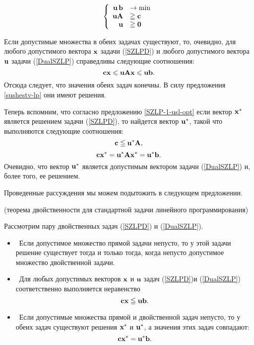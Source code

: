 \begin{equation}\label{DualSZLP}
\left\{
\begin{array}{rl}
 \mathbf{u} \, \mathbf{b} & \to \min  \\
 \mathbf{u} \mathbf{A} & \geqq \mathbf{c} \\
 \mathbf{u} & \geqq \mathbf{0} \\
\end{array} \right.
\end{equation}


    Если допустимые множества в обеих задачах существуют, то, очевидно, для
    любого допустимого вектора $\mathbf{x}$ задачи (\ref{SZLPD}) и
    любого допустимого вектора $\mathbf{u}$ задачи (\ref{DualSZLP})
    справедливы следующие соотношения:
    \[\mathbf{c}\mathbf{x}\leqslant\mathbf{u}\mathbf{A}\mathbf{x}\leqslant\mathbf{u}\mathbf{b}.\]
    Отсюда следует, что значения обеих задач конечны. В силу
    предложения \ref{sushestv-lp} они имеют решения.

    Теперь вспомним, что согласно предложению \ref{SZLP-1-usl-opt}
    если вектор $\mathbf{x^{*}}$ является решением задачи (\ref{SZLPD}),
    то найдется вектор $\mathbf{u^{*}}$, такой что выполняются следующие
    соотношения:
    \[\mathbf{c}\leqq \mathbf{u}^{*}\mathbf{A},\]
    \[\mathbf{c}\mathbf{x}^{*}=\mathbf{u}^{*}\mathbf{A}\mathbf{x}^{*}=\mathbf{u}^{*}\mathbf{b}.\]
    Очевидно, что вектор $\mathbf{u^{*}}$ является допустимым вектором
    задачи (\ref{DualSZLP}) и, более того, ее решением.

    Проведенные рассуждения мы можем подытожить в следующем предложении.

\begin{prop} \label{teor-dv-st} (теорема двойственности для
стандартной задачи линейного программирования)

    Рассмотрим пару двойственных задач (\ref{SZLPD}) и
    (\ref{DualSZLP}).
\begin{itemize}
    \item [$1)$\ ] \
    Если допустимое множество прямой задачи непусто, то у этой
    задачи решение существует тогда и только тогда, когда непусто
    допустимое множество двойственной задачи.
    \item [$2)$\ ] \
    Для любых допустимых векторов $\mathbf{x}$ и $\mathbf{u}$
    задач (\ref{SZLPD})и
    (\ref{DualSZLP}) соответственно выполняется неравенство
    \[\mathbf{c}\mathbf{x}\leqq\mathbf{u}\mathbf{b}.\]
    \item [$3)$\ ] \
    Если допустимые множества прямой и двойственной задач непусто,
    то у обеих задач существуют решения $\mathbf{x^{*}}$ и $\mathbf{u^{*}}$,
    а значения этих задач совпадают:
    \[\mathbf{c}\mathbf{x}^{*}=\mathbf{u}^{*}\mathbf{b}.\]

\end{itemize}
\end{prop}

